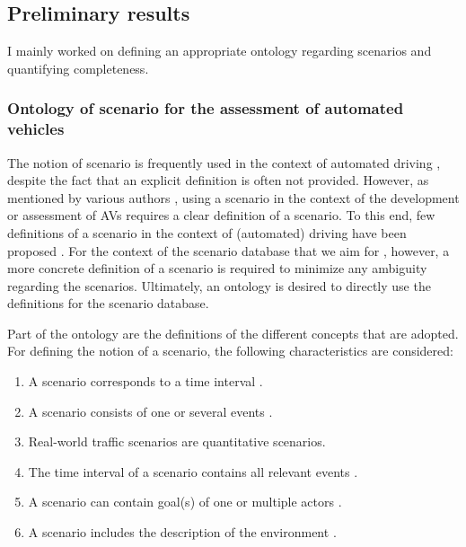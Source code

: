 


\subsection{Preliminary results}
\label{sec:results}

I mainly worked on defining an appropriate ontology regarding scenarios and quantifying completeness. 

\subsubsection{Ontology of scenario for the assessment of automated vehicles}
\label{sec:ontology}

The notion of scenario is frequently used in the context of automated driving \cite{putz2017pegasus, roesener2017comprehensive, gietelink2006development, hulshof2013autonomous, karaduman2013interactivebehavior, englund2016grand, xu2002effects, ebner2011identifying, ploeg2017GCDC, zofka2015datadrivetrafficscenarios}, despite the fact that an explicit definition is often not provided. However, as mentioned by various authors \cite{stellet2015taxonomy, alvarez2017prospective, zofka2015datadrivetrafficscenarios, aparicio2013pre, lesemann2011test, putz2017pegasus, geyer2014, ulbrich2015}, using a scenario in the context of the development or assessment of AVs requires a clear definition of a scenario. To this end, few definitions of a scenario in the context of (automated) driving have been proposed \cite{geyer2014, ulbrich2015, elrofai2016scenario}. For the context of the scenario database that we aim for \cite{elrofai2018scenario}, however, a more concrete definition of a scenario is required to minimize any ambiguity regarding the scenarios. Ultimately, an ontology is desired to directly use the definitions for the scenario database.

Part of the ontology are the definitions of the different concepts that are adopted. For defining the notion of a scenario, the following characteristics are considered:
\begin{enumerate}
	\item A scenario corresponds to a time interval \cite{go2004blind, geyer2014, ulbrich2015, elrofai2016scenario}.
	\item A scenario consists of one or several events \cite{vannotten2003updated, go2004blind, geyer2014, ulbrich2015, kahn1962, englund2016grand, schoemaker1993multiple, cuppens2002alert, bach2016modelbased}.
	\item Real-world traffic scenarios are quantitative scenarios.
	\item The time interval of a scenario contains all relevant events \cite{geyer2014}.
	\item A scenario can contain goal(s) of one or multiple actors \cite{geyer2014, ulbrich2015, elrofai2016scenario}.
	\item A scenario includes the description of the environment \cite{geyer2014, ulbrich2015, elrofai2016scenario, ebner2011identifying, schuldt2013effiziente, althoff2017CommonRoad}.
\end{enumerate}

